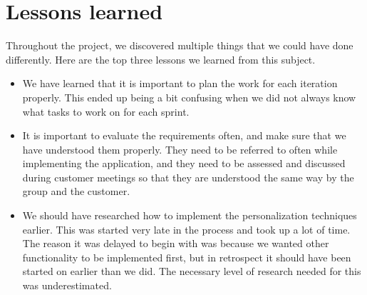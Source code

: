 \section{Lessons learned}

Throughout the project, we discovered multiple things that we could have done differently. Here are the top three lessons we learned from this subject.

\begin{itemize}
\item We have learned that it is important to plan the work for each iteration properly. This ended up being a bit confusing when we did not always know what tasks to work on for each sprint.

\item It is important to evaluate the requirements often, and make sure that we have understood them properly. They need to be referred to often while implementing the application, and they need to be assessed and discussed during customer meetings so that they are understood the same way by the group and the customer.

\item We should have researched how to implement the personalization techniques earlier. This was started very late in the process and took up a lot of time. The reason it was delayed to begin with was because we wanted other functionality to be implemented first, but in retrospect it should have been started on earlier than we did. The necessary level of research needed for this was underestimated.
\end{itemize}

\cleardoublepage